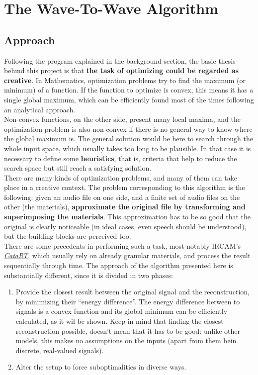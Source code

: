 \documentclass[11pt]{scrartcl} %
\begin{document}
\vspace{5mm}
\section*{The Wave-To-Wave Algorithm}

\subsection*{Approach}
Following the program explained in the background section, the basic thesis behind this project is that \textbf{the task of optimizing could be regarded as creative}. In Mathematics, optimization problems try to find the maximum (or minimum) of a function. If the function to optimize is convex, this means it has a single global maximum, which can be efficiently found most of the times following an analytical approach.\\
Non-convex functions, on the other side, present many local maxima, and the optimization problem is also non-convex if there is no general way to know where the global maximum is. The general solution would be here to search through the whole input space, which usually takes too long to be plausible. In that case it is necessary to define some \textbf{heuristics}, that is, criteria that help to reduce the search space but still reach a satisfying solution.\\[7pt]
There are many kinds of optimization problems, and many of them can take place in a creative context. The problem corresponding to this algorithm is the following: given an audio file on one side, and a finite set of audio files on the other (the materials), \textbf{approximate the original file by transforming and superimposing the materials}. This approximation has to be so good that the original is clearly noticeable (in ideal cases, even speech should be understood), but the building blocks are perceived too.\\[7pt]
There are some precedents in performing such a task, most notably IRCAM's \href{http://imtr.ircam.fr/imtr/CataRT}{{\it CataRT}}, which usually rely on already granular materials, and process the result sequentially through time. The approach of the algorithm presented here is substantially different, since it is divided in two phases:
\begin{enumerate}
\item Provide the closest result between the original signal and the reconstruction, by minimizing their ``energy difference''. The energy difference between to signals is a convex function and its global minimum can be efficiently calculated, as it wil be shown. Keep in mind that finding the closest reconstruction possible, doesn't mean that it has to be good: unlike other models, this makes no assumptions on the inputs (apart from them bein discrete, real-valued signals).
\item Alter the setup to force suboptimalities in diverse ways.
\end{enumerate}
\end{document}
